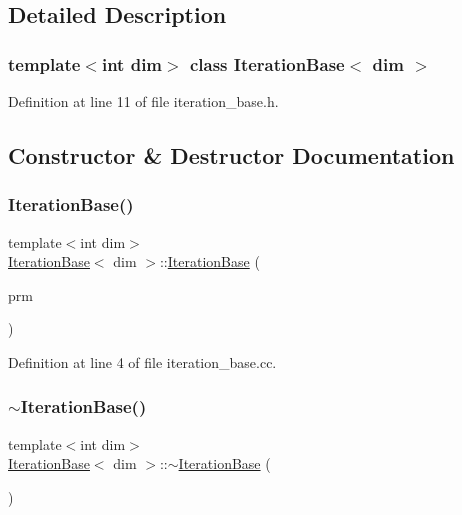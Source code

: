 \subsection{Detailed Description}
\subsubsection*{template$<$int dim$>$\newline
class Iteration\+Base$<$ dim $>$}



Definition at line 11 of file iteration\+\_\+base.\+h.



\subsection{Constructor \& Destructor Documentation}
\mbox{\label{class_iteration_base_a385009434fcdf512953f317088e09b0b}} 
\subsubsection{\texorpdfstring{Iteration\+Base()}{IterationBase()}}
{\footnotesize\ttfamily template$<$int dim$>$ \\
\hyperlink{class_iteration_base}{Iteration\+Base}$<$ dim $>$\+::\hyperlink{class_iteration_base}{Iteration\+Base} (\begin{DoxyParamCaption}\item[{const Parameter\+Handler \&}]{prm }\end{DoxyParamCaption})}



Definition at line 4 of file iteration\+\_\+base.\+cc.

\mbox{\label{class_iteration_base_a942860f3a03d46da883c1c6c430bea55}} 
\subsubsection{\texorpdfstring{$\sim$\+Iteration\+Base()}{~IterationBase()}}
{\footnotesize\ttfamily template$<$int dim$>$ \\
\hyperlink{class_iteration_base}{Iteration\+Base}$<$ dim $>$\+::$\sim$\hyperlink{class_iteration_base}{Iteration\+Base} (\begin{DoxyParamCaption}{ }\end{DoxyParamCaption})\hspace{0.3cm}{\ttfamily [virtual]}}



